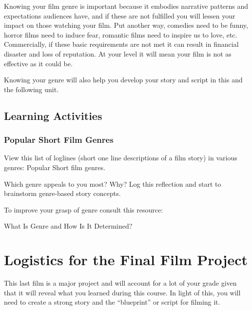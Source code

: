 \documentclass[
]{book}
\begin{document}
Knowing your film genre is important because it embodies narrative patterns and expectations audiences have, and if these are not fulfilled you will lessen your impact on those watching your film. Put another way, comedies need to be funny, horror films need to induce fear, romantic films need to inspire us to love, etc. Commercially, if these basic requirements are not met it can result in financial disaster and loss of reputation. At your level it will mean your film is not as effective as it could be.

Knowing your genre will also help you develop your story and script in this and the following unit.

\hypertarget{learning-activities-6}{%
\subsection*{Learning Activities}\label{learning-activities-6}}

\begin{reflect}
\hypertarget{popular-short-film-genres}{%
\subsubsection*{Popular Short Film Genres}\label{popular-short-film-genres}}

View this list of loglines (short one line descriptions of a film story) in various genres: Popular Short film genres.

Which genre appeals to you most? Why? Log this reflection and start to brainstorm genre-based story concepts.

To improve your grasp of genre consult this resource:

What Is Genre and How Is It Determined?
\end{reflect}

\hypertarget{logistics-for-the-final-film-project}{%
\section*{Logistics for the Final Film Project}\label{logistics-for-the-final-film-project}}

This last film is a major project and will account for a lot of your grade given that it will reveal what you learned during this course. In light of this, you will need to create a strong story and the ``blueprint'' or script for filming it.
\end{document}
